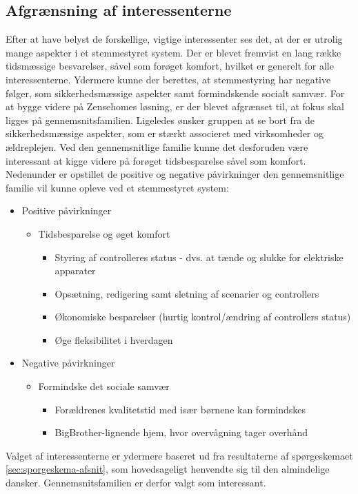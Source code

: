 \subsection{Afgrænsning af interessenterne}
Efter at have belyst de forskellige, vigtige interessenter ses det, at der er utrolig mange aspekter i et stemmestyret system. Der er blevet fremvist en lang række tidsmæssige besvarelser, såvel som forøget komfort, hvilket er generelt for alle interessenterne. Ydermere kunne der berettes, at stemmestyring har negative følger, som sikkerhedsmæssige aspekter samt formindskende socialt samvær. For at bygge videre på Zensehomes løsning, er der blevet afgrænset til, at fokus skal ligges på gennemsnitsfamilien. Ligeledes ønsker gruppen at se bort fra de sikkerhedsmæssige aspekter, som er stærkt associeret med virksomheder og ældreplejen. Ved den gennemsnitlige familie kunne det desforuden være interessant at kigge videre på forøget tidsbesparelse såvel som komfort. Nedenunder er opstillet de positive og negative påvirkninger den gennemsnitlige familie vil kunne opleve ved et stemmestyret system: 
\begin{itemize}
    \item Positive påvirkninger
    \begin{itemize}
        \item Tidsbesparelse og øget komfort
        \begin{itemize}
            \item Styring af controlleres status - dvs. at tænde og slukke for elektriske apparater
            \item Opsætning, redigering samt sletning af scenarier og controllers
            \item Økonomiske besparelser (hurtig kontrol/ændring af controllers status)
            \item Øge fleksibilitet i hverdagen
        \end{itemize}
    \end{itemize}
    \item Negative påvirkninger
    \begin{itemize}
        \item Formindske det sociale samvær
        \begin{itemize}
            \item Forældrenes kvalitetstid med især børnene kan formindskes
            \item BigBrother-lignende hjem, hvor overvågning tager overhånd
        \end{itemize}
    \end{itemize}
\end{itemize}

Valget af interessenterne er ydermere baseret ud fra resultaterne af spørgeskemaet \ref{sec:sporgeskema-afsnit}, som hovedsageligt henvendte sig til den almindelige dansker. Gennemsnitsfamilien er derfor valgt som interessant.
